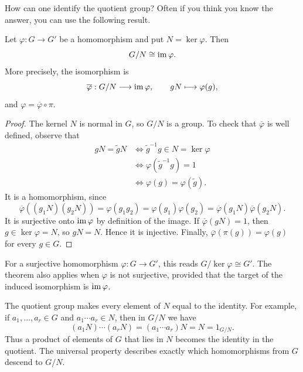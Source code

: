 \documentclass[reqno,11pt]{amsart}
\begin{document}
How can one identify the quotient group? Often if you think you know the answer, you can use the following result.


\begin{theorem}\label{thm:first-iso}
Let $\varphi:G\to G'$ be a homomorphism and put $N=\ker\varphi$.
Then
\[
  G/N\cong\operatorname{im}\varphi.
\]
More precisely, the isomorphism is
\[
  \overline\varphi:G/N\longrightarrow\operatorname{im}\varphi,
  \qquad gN\longmapsto\varphi(g),
\]
and $\varphi=\overline\varphi\circ\pi$.
\end{theorem}
\begin{proof}
The kernel $N$ is normal in $G$, so $G/N$ is a group.
To check that $\overline\varphi$ is well defined, observe that
\begin{align*}
  gN=\widetilde gN
  &\iff \widetilde g^{-1}g\in N=\ker\varphi\\
  &\iff \varphi(\widetilde g^{-1}g)=1\\
  &\iff \varphi(g)=\varphi(\widetilde g).
\end{align*}
It is a homomorphism, since
\[
  \overline\varphi((g_1N)(g_2N))
  =\varphi(g_1g_2)
  =\varphi(g_1)\varphi(g_2)
  =\overline\varphi(g_1N)\overline\varphi(g_2N).
\]
It is surjective onto $\operatorname{im}\varphi$ by definition of the image.
If $\overline\varphi(gN)=1$, then $g\in\ker\varphi=N$, so
$gN=N$. Hence it is injective. Finally,
$\overline\varphi(\pi(g))=\varphi(g)$ for every $g\in G$.
\end{proof}

For a surjective homomorphism $\varphi:G\to G'$, this reads
$G/\ker\varphi\cong G'$. The theorem also applies when $\varphi$
is not surjective, provided that the target of the induced
isomorphism is $\operatorname{im}\varphi$.



The quotient group makes every element of $N$ equal to the identity.
For example, if $a_1,\ldots,a_r\in G$ and
$a_1\cdots a_r\in N$, then in $G/N$ we have
\[
(a_1N)\cdots(a_rN)=(a_1\cdots a_r)N=N=1_{G/N}.
\]
Thus a product of elements of $G$ that lies in $N$ becomes the
identity in the quotient. The universal property describes exactly
which homomorphisms from $G$ descend to $G/N$.
\end{document}

